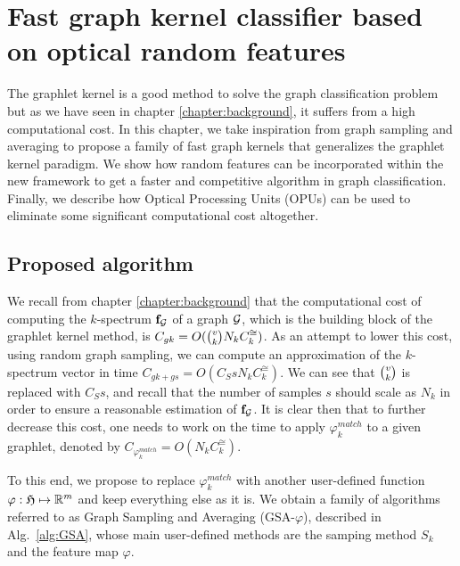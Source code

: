 \chapter{Fast graph kernel classifier based on optical random features }
\label{chapter:fast_algorithm}
\newtheorem{lemma}{Lemma} 
The graphlet kernel  is a good method to solve the graph classification problem but as we have seen in chapter \ref{chapter:background}, it suffers from a high computational cost. In this chapter, we take inspiration from graph sampling and averaging to propose a family of fast graph kernels that generalizes the graphlet kernel paradigm. We show how random features can be incorporated within the new framework to get a faster and competitive algorithm in graph classification. Finally, we describe how Optical Processing Units (OPUs) can be used to eliminate some significant computational cost altogether.

\section{Proposed algorithm}
We recall from chapter \ref{chapter:background} that the computational cost of computing the $k$-spectrum $\mathbf{f}_{\mathcal{G}}$ of a graph $\mathcal{G}$, which is the building block of the graphlet kernel method, is $C_{gk}= O(\tbinom{v}{k} N_k C_k^{\cong})$. As an attempt to lower this cost, using random graph sampling, we can compute an approximation of the $k$-spectrum vector in time $C_{gk + gs}= O(C_S s N_k C_k^{\cong})$. We can see that $\tbinom{v}{k}$ is replaced with $C_S s$, and recall that the number of samples $s$  should scale as $N_k$ in order to ensure a reasonable estimation of $\mathbf{f}_{\mathcal{G}}$. It is clear then that to further decrease this cost, one needs to work on the time to apply $\varphi_k^{match}$ to a given graphlet, denoted by $C_{\varphi_k^{match}}=O(N_k C_k^{\cong})$.

To this end, we propose to replace $\varphi^{match}_k$ with another user-defined function $\varphi:\mathfrak{H} \mapsto\mathbb{R}^m$ and keep everything else as it is. We obtain a family of algorithms referred to as Graph Sampling and Averaging (GSA-$\varphi$), described in Alg.~\ref{alg:GSA}, whose main user-defined methods are the samping method $S_k$ and the feature map $\varphi$.

